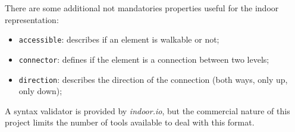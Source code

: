 There are some additional not mandatories properties useful for
the indoor representation:

\begin{itemize}
\itemsep1pt\parskip0pt
\item
 \texttt{accessible}: describes if an element is walkable or not;
\item
 \texttt{connector}: defines if the element is a connection between two
 levels;
\item
 \texttt{direction}: describes the direction of the connection (both
 ways, only up, only down);
\end{itemize}

A syntax validator is provided by \emph{indoor.io}, but the commercial nature
of this project limits the number of tools available to deal with this
format.
